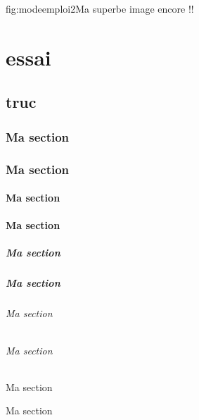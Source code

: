 \documentclass[overfullbox]{polytech}
\begin{document}
\begin{Figure}{fig:modeemploi2}{Ma superbe image encore !!}
\end{Figure}

\part{essai}
\label{part:essai}

\chapter{truc}
\lipsum[1-20]

\ref{part:essai}

\section{Ma section}
\lipsum[1-5]

\section{Ma section}
\lipsum[1-5]

\subsection{Ma section}
\lipsum[1-5]
\subsection{Ma section}
\lipsum[1-5]
\subsubsection{Ma section}
\lipsum[1-5]
\subsubsection{Ma section}
\lipsum[1-5]
\paragraph{Ma section}
\lipsum[1-5]
\paragraph{Ma section}
\lipsum[1-5]
\subparagraph{Ma section}
\lipsum[1-5]
\subparagraph{Ma section}
\lipsum[1-5]



\makeatletter
\end{document}
